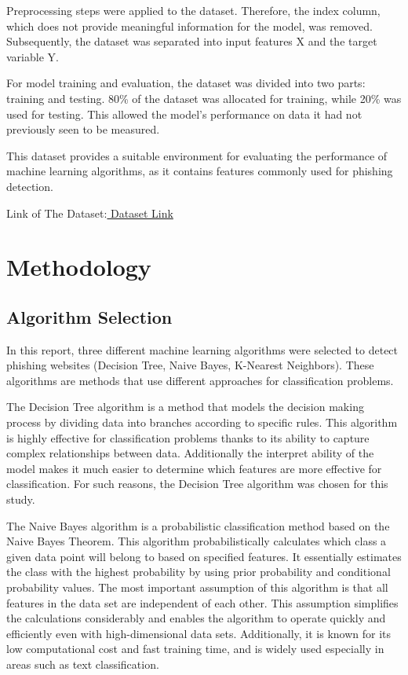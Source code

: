 \documentclass[conference]{IEEEtran}
\begin{document}
    Preprocessing steps were applied to the dataset. Therefore, the index column, which does not provide meaningful information for the model, was removed. Subsequently, the dataset was separated into input features X and the target variable Y.

    For model training and evaluation, the dataset was divided into two parts: training and testing. 80\% of the dataset was allocated for training, while 20\% was used for testing. This allowed the model's performance on data it had not previously seen to be measured.

    This dataset provides a suitable environment for evaluating the performance of machine learning algorithms, as it contains features commonly used for phishing detection.


Link of The Dataset:\href{https://www.kaggle.com/datasets/akashkr/phishing-website-dataset}{ Dataset Link}
	
	\section{Methodology}
	\label{sec:methodology}
	
	\subsection{Algorithm Selection}
    In this report, three different machine learning algorithms were selected to detect phishing websites (Decision Tree, Naive Bayes, K-Nearest Neighbors). These algorithms are methods that use different approaches for classification problems.

    The Decision Tree algorithm is a method that models the decision making process by dividing data into branches according to specific rules. This algorithm is highly effective for classification problems thanks to its ability to capture complex relationships between data. Additionally the interpret ability of the model makes it much easier to determine which features are more effective for classification. For such reasons, the Decision Tree algorithm was chosen for this study.

    The Naive Bayes algorithm is a probabilistic classification method based on the Naive Bayes Theorem. This algorithm probabilistically calculates which class a given data point will belong to based on specified features. It essentially estimates the class with the highest probability by using prior probability and conditional probability values. The most important assumption of this algorithm is that all features in the data set are independent of each other. This assumption simplifies the calculations considerably and enables the algorithm to operate quickly and efficiently even with high-dimensional data sets. Additionally, it is known for its low computational cost and fast training time, and is widely used especially in areas such as text classification.
\end{document}
